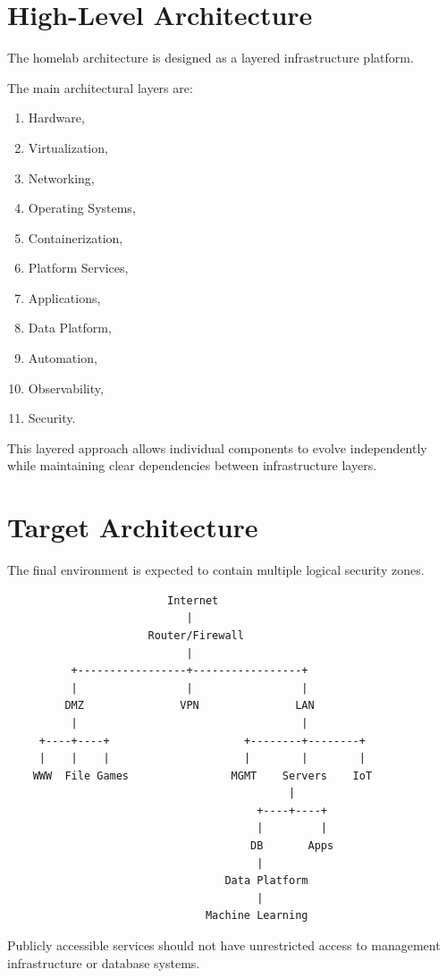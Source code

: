 \section{High-Level Architecture}

The homelab architecture is designed as a layered infrastructure platform.

The main architectural layers are:

\begin{enumerate}
    \item Hardware,
    \item Virtualization,
    \item Networking,
    \item Operating Systems,
    \item Containerization,
    \item Platform Services,
    \item Applications,
    \item Data Platform,
    \item Automation,
    \item Observability,
    \item Security.
\end{enumerate}

This layered approach allows individual components to evolve independently
while maintaining clear dependencies between infrastructure layers.

\newpage
\section{Target Architecture}

The final environment is expected to contain multiple logical security zones.

\begin{verbatim}
                         Internet
                            |
                      Router/Firewall
                            |
          +-----------------+-----------------+
          |                 |                 |
         DMZ               VPN               LAN
          |                                   |
     +----+----+                     +--------+--------+
     |    |    |                     |        |        |
    WWW  File Games                MGMT    Servers    IoT
                                            |
                                       +----+----+
                                       |         |
                                      DB       Apps
                                       |
                                  Data Platform
                                       |
                               Machine Learning
\end{verbatim}

Publicly accessible services should not have unrestricted access to
management infrastructure or database systems.